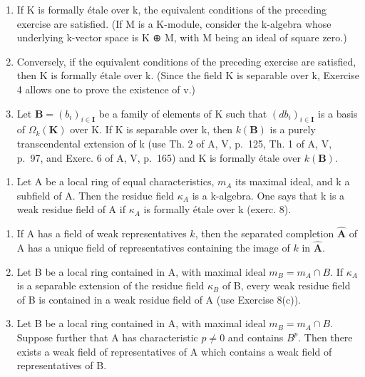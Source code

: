 \begin{enumerate}
\def\labelenumi{\alph{enumi})}
\item
  If K is formally étale over k, the equivalent conditions of the preceding exercise are satisfied. (If M is a K-module, consider the k-algebra whose underlying k-vector space is K ⊕ M, with M being an ideal of square zero.)
\item
  Conversely, if the equivalent conditions of the preceding exercise are satisfied, then K is formally étale over k. (Since the field K is separable over k, Exercise 4 allows one to prove the existence of v.)
\item
  Let \(\mathbf{B} = (b_{i})_{i\in\mathbf{I}}\) be a family of elements of K such that \((db_{i})_{i\in\mathbf{I}}\) is a basis of \(\Omega_{k}(\mathbf{K})\) over K. If K is separable over k, then \(k(\mathbf{B})\) is a purely transcendental extension of k (use Th. 2 of A, V, p.~125, Th. 1 of A, V, p.~97, and Exerc. 6 of A, V, p.~165) and K is formally étale over \(k(\mathbf{B})\).
\end{enumerate}

\begin{enumerate}
\def\labelenumi{\arabic{enumi})}
\setcounter{enumi}{8}
\tightlist
\item
  Let A be a local ring of equal characteristics, \(m_{A}\) its maximal ideal, and k a subfield of A. Then the residue field \(\kappa_{A}\) is a k-algebra. One says that k is a weak residue field of A if \(\kappa_{A}\) is formally étale over k (exerc. 8).
\end{enumerate}

\begin{enumerate}
\def\labelenumi{\alph{enumi})}
\item
  If A has a field of weak representatives \(k\), then the separated completion \(\hat{\mathbf{A}}\) of A has a unique field of representatives containing the image of \(k\) in \(\hat{\mathbf{A}}\).
\item
  Let B be a local ring contained in A, with maximal ideal \(m_{B} = m_{A} \cap B\). If \(\kappa_{A}\) is a separable extension of the residue field \(\kappa_{B}\) of B, every weak residue field of B is contained in a weak residue field of A (use Exercise 8(c)).
\item
  Let B be a local ring contained in A, with maximal ideal \(m_{B} = m_{A} \cap B\). Suppose further that A has characteristic \(p\ne0\) and contains \(B^{p}\). Then there exists a weak field of representatives of A which contains a weak field of representatives of B.
\end{enumerate}
